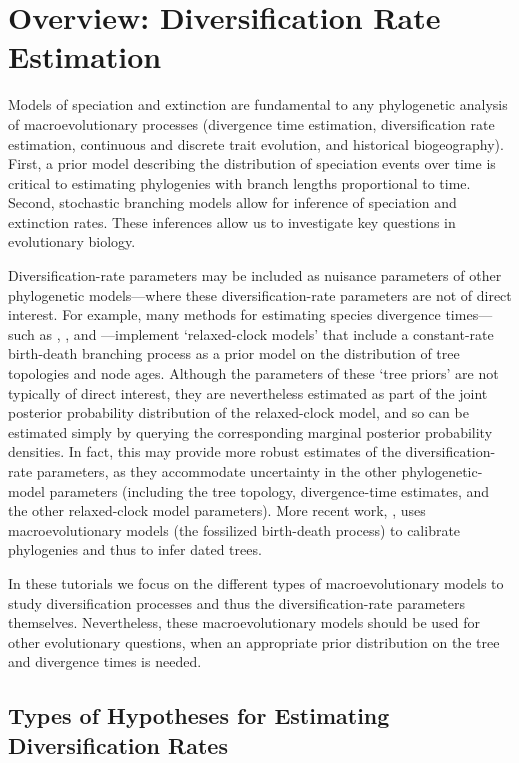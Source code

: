 \section{Overview: Diversification Rate Estimation} \label{sec:diversification_rate_overview}

Models of speciation and extinction are fundamental to any phylogenetic analysis of macroevolutionary processes (\EG divergence time estimation, diversification rate estimation, continuous and discrete trait evolution, and historical biogeography).
First, a prior model describing the distribution of speciation events over time is critical to estimating phylogenies with branch lengths proportional to time.
Second, stochastic branching models allow for inference of speciation and extinction rates.
These inferences allow us to investigate key questions in evolutionary biology.

Diversification-rate parameters may be included as nuisance parameters of other phylogenetic models---\IE where these diversification-rate parameters are not of direct interest.
For example, many methods for estimating species divergence times---such as \BEAST \citep{Drummond2012}, \MrBayes \citep{Ronquist2012}, and \RevBayes \citep{Hoehna2016b}---implement `relaxed-clock models' that include a constant-rate birth-death branching process as a prior model on the distribution of tree topologies and node ages.
Although the parameters of these `tree priors' are not typically of direct interest, they are nevertheless estimated as part of the joint posterior probability distribution of the relaxed-clock model, and so can be estimated simply by querying the corresponding marginal posterior probability densities.
In fact, this may provide more robust estimates of the diversification-rate parameters, as they accommodate uncertainty in the other phylogenetic-model parameters (including the tree topology, divergence-time estimates, and the other relaxed-clock model parameters).
More recent work, \EG \cite{Heath2014}, uses macroevolutionary models (the fossilized birth-death process) to calibrate phylogenies and thus to infer dated trees.

In these tutorials we focus on the different types of macroevolutionary models to study diversification processes and thus the diversification-rate parameters themselves.
Nevertheless, these macroevolutionary models should be used for other evolutionary questions, when an appropriate prior distribution on the tree and divergence times is needed.


\subsection{Types of Hypotheses for Estimating Diversification Rates}

